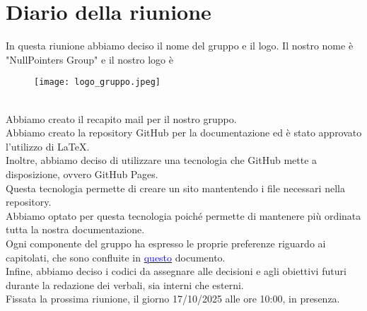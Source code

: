\section{Diario della riunione}

	In questa riunione abbiamo deciso il nome del gruppo e il logo. Il nostro nome è "NullPointers Group" e il nostro logo è
	\begin{figure}[h]
		\begin{center}
			\texttt{[image: logo\_gruppo.jpeg]}
		\end{center}
	\end{figure}\\
	Abbiamo creato il recapito mail per il nostro gruppo.\\
	Abbiamo creato la repository GitHub per la documentazione ed è stato approvato l'utilizzo di LaTeX.\\
	Inoltre, abbiamo deciso di utilizzare una tecnologia che GitHub mette a disposizione, ovvero GitHub Pages.\\
	Questa tecnologia permette di creare un sito mantentendo i file necessari nella repository.\\
	Abbiamo optato per questa tecnologia poiché permette di mantenere più ordinata tutta la nostra documentazione.\\
    Ogni componente del gruppo ha espresso le proprie preferenze riguardo ai capitolati, che sono confluite in \href{https://docs.google.com/spreadsheets/d/1QaMKRtNCo9-x2O6sPm80BQgh0mwIuRUwIfmQZ6hzgeY/edit?gid=0#gid=0}{\textcolor{blue}{questo}} documento.\\
    Infine, abbiamo deciso i codici da assegnare alle decisioni e agli obiettivi futuri durante la redazione dei verbali, sia interni che esterni.\\
    Fissata la prossima riunione, il giorno 17/10/2025 alle ore 10:00, in presenza.